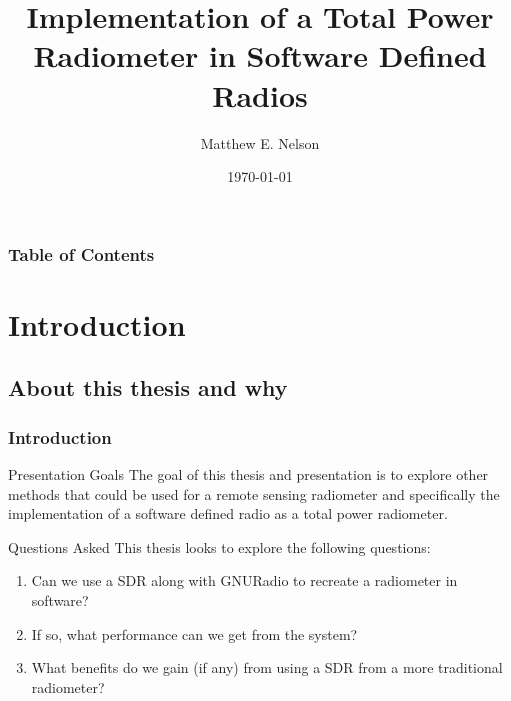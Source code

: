 \documentclass{beamer}
\title[SDR Radiometer]{Implementation of a Total Power Radiometer in Software Defined Radios}
\author{Matthew E. Nelson}
\institute[ISU] 
{
Iowa State University \\ 
\medskip
\textit{mnelson@iastate.edu} %
}
\date{\today}
\begin{document}
\begin{frame}
\titlepage 
\end{frame}

\begin{frame}[allowframebreaks]
\frametitle{Table of Contents} 
\tableofcontents 
\end{frame}


\section{Introduction} 
\subsection{About this thesis and why}
\begin{frame}
\frametitle{Introduction}
\begin{block}{Presentation Goals}
The goal of this thesis and presentation is to explore other methods that could be used for a remote sensing radiometer and specifically the implementation of a software defined radio as a total power radiometer.
\end{block}
\pause

\begin{block}{Questions Asked}
This thesis looks to explore the following questions: 
\begin{enumerate}
\item Can we use a SDR along with GNURadio to recreate a radiometer in software?
\item If so, what performance can we get from the system?
\item What benefits do we gain (if any) from using a SDR from a more traditional radiometer?
\end{enumerate}
\end{block}
\end{frame} 
\end{document}
